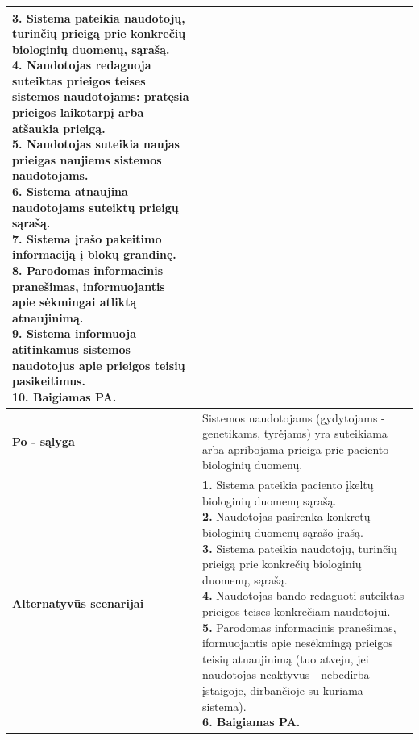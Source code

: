 \documentclass[12pt]{article}
\begin{document}
\begin{table}[htb!]
\begin{tabular}{|m{3cm}|m{13.7cm}|}
{{            \textbf{3.} {Sistema pateikia naudotojų,
            turinčių prieigą prie konkrečių biologinių duomenų, sąrašą.} \\
            \textbf{4.} \textcolor{dartmouthgreen}{Naudotojas redaguoja
            suteiktas prieigos teises sistemos naudotojams: pratęsia prieigos
            laikotarpį arba atšaukia prieigą.} \\
            \textbf{5.} \textcolor{dartmouthgreen}{Naudotojas suteikia
            naujas prieigas naujiems sistemos naudotojams.} \\
            \textbf{6.} {Sistema atnaujina naudotojams
            suteiktų prieigų sąrašą.} \\
            \textbf{7.} {Sistema įrašo pakeitimo
            informaciją į blokų grandinę.} \\
            \textbf{8.} {Parodomas informacinis
            pranešimas, informuojantis apie sėkmingai atliktą atnaujinimą.} \\
            \textbf{9.} {Sistema informuoja atitinkamus
            sistemos naudotojus apie prieigos teisių pasikeitimus.} \\
            \textbf{10. Baigiamas PA.}
        }}
        \\
        \hline
        \raggedleft \textbf{\cellcolor{deepchampagne}Po - sąlyga} &
        Sistemos naudotojams (gydytojams - genetikams, tyrėjams) yra suteikiama
        arba apribojama prieiga prie paciento biologinių duomenų. \\
        \hline
        \raggedleft \textbf{\cellcolor{deepchampagne}Alternatyvūs scenarijai} &
        \vskip 5pt
        \makecell[l]{\parbox[t]{13.7cm}{
            \textbf{1.} {Sistema pateikia paciento
            įkeltų biologinių duomenų sąrašą.} \\
            \textbf{2.} \textcolor{dartmouthgreen}{Naudotojas pasirenka
            konkretų biologinių duomenų sąrašo įrašą.} \\
            \textbf{3.} {Sistema pateikia naudotojų,
            turinčių prieigą prie konkrečių biologinių duomenų, sąrašą.} \\
            \textbf{4.} \textcolor{dartmouthgreen}{Naudotojas bando redaguoti
            suteiktas prieigos teises konkrečiam naudotojui.} \\
            \textbf{5.} \textcolor{dartmouthgreen}{Parodomas informacinis
            pranešimas, iformuojantis apie nesėkmingą prieigos teisių
            atnaujinimą (tuo atveju, jei naudotojas neaktyvus - nebedirba
            įstaigoje, dirbančioje su kuriama sistema).} \\
            \textbf{6. Baigiamas PA.}
        }}
        \\
        \hline
    \end{tabular}
\end{table}
\end{document}
